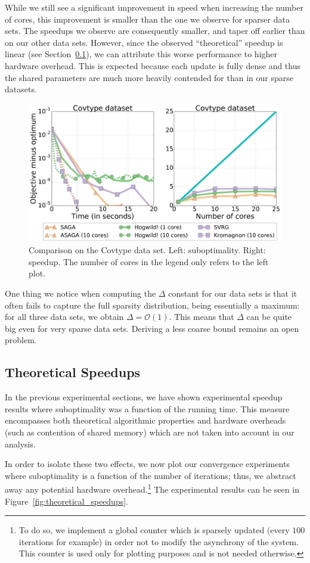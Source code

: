 \documentclass[twoside, 11pt]{article}
\newcommand{\sparsity}{\Delta}
\begin{document}
While we still see a significant improvement in speed when increasing the number of cores, this improvement is smaller than the one we observe for sparser data sets.
The speedups we observe are consequently smaller, and taper off earlier than on our other data sets.
However, since the observed ``theoretical'' speedup is linear (see Section~\ref{apx:speedup}), we can attribute this worse performance to higher hardware overhead.
This is expected because each update is fully dense and thus the shared parameters are much more heavily contended for than in our sparse datasets.

\begin{figure}
	\center \includegraphics[width=0.7\linewidth]{figures/figure_covtype.pdf}
	\caption{Comparison on the Covtype data set. Left: suboptimality. Right: speedup. The number of cores in the legend only refers to the left plot. }\label{fig:covtype}
\end{figure}

One thing we notice when computing the $\sparsity$ constant for our data sets is that it often fails to capture the full sparsity distribution, being essentially a maximum: for all three data sets, we obtain $\sparsity = \mathcal{O}(1)$.
This means that $\sparsity$ can be quite big even for very sparse data sets.
Deriving a less coarse bound remains an open problem.

\subsection{Theoretical Speedups}\label{apx:speedup}
In the previous experimental sections, we have shown experimental speedup results where suboptimality was a function of the running time.
This measure encompasses both theoretical algorithmic properties and hardware overheads (such as contention of shared memory) which are not taken into account in our analysis.

In order to isolate these two effects, we now plot our convergence experiments where suboptimality is a function of the number of iterations; thus, we abstract away any potential hardware overhead.\footnote{To do so, we implement a global counter which is sparsely updated (every $100$ iterations for example) in order not to modify the asynchrony of the system.
	This counter is used only for plotting purposes and is not needed otherwise.
}
The experimental results can be seen in Figure~\ref{fig:theoretical_speedups}.
\end{document}
